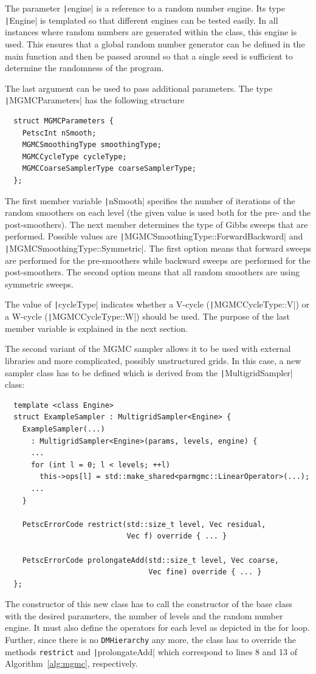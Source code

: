 \documentclass[
fontsize=11pt,
paper=a4,
numbers=noenddot
]{scrartcl}
\begin{document}
The parameter \texttt|engine| is a reference to a random number engine. Its type \texttt|Engine| is templated so that different engines can be tested easily. In all instances where random numbers are generated within the class, this engine is used. This ensures that a global random number generator can be defined in the main function and then be passed around so that a single seed is sufficient to determine the randomness of the program.

The last argument can be used to pass additional parameters. The type \texttt|MGMCParameters| has the following structure
\begin{verbatim}
  struct MGMCParameters {
    PetscInt nSmooth;
    MGMCSmoothingType smoothingType;
    MGMCCycleType cycleType;
    MGMCCoarseSamplerType coarseSamplerType;
  };
\end{verbatim}
The first member variable \texttt|nSmooth| specifies the number of iterations of the random smoothers on each level (the given value is used both for the pre- and the post-smoothers). The next member determines the type of Gibbs sweeps that are performed. Possible values are \texttt|MGMCSmoothingType::ForwardBackward| and \texttt|MGMCSmoothingType::Symmetric|. The first option means that forward sweeps are performed for the pre-smoothers while backward sweeps are performed for the post-smoothers. The second option means that all random smoothers are using symmetric sweeps.

The value of \texttt|cycleType| indicates whether a V-cycle (\texttt|MGMCCycleType::V|) or a W-cycle (\texttt|MGMCCycleType::W|) should be used. The purpose of the last member variable is explained in the next section. 

The second variant of the MGMC sampler allows it to be used with external libraries and more complicated, possibly unstructured grids. In this case, a new sampler class has to be defined which is derived from the \texttt|MultigridSampler| class:
\begin{verbatim}
  template <class Engine> 
  struct ExampleSampler : MultigridSampler<Engine> {
    ExampleSampler(...)
      : MultigridSampler<Engine>(params, levels, engine) {
      ...
      for (int l = 0; l < levels; ++l)
        this->ops[l] = std::make_shared<parmgmc::LinearOperator>(...);
      ...
    }

    PetscErrorCode restrict(std::size_t level, Vec residual, 
                            Vec f) override { ... }

    PetscErrorCode prolongateAdd(std::size_t level, Vec coarse,
                                 Vec fine) override { ... }
  };    
\end{verbatim}
The constructor of this new class has to call the constructor of the base class with the desired parameters, the number of levels and the random number engine. It must also define the operators for each level as depicted in the for loop. Further, since there is no \texttt{DMHierarchy} any more, the class has to override the methods \texttt{restrict} and \texttt|prolongateAdd| which correspond to lines 8 and 13 of Algorithm~\ref{alg:mgmc}, respectively.
\end{document}
